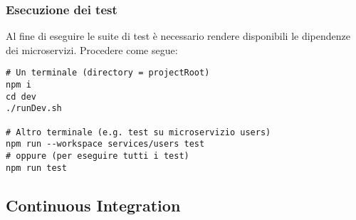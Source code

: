 


%
%
%
\subsubsection{Esecuzione dei test}

Al fine di eseguire le suite di test è necessario rendere disponibili le dipendenze dei microservizi.
%
Procedere come segue:

\begin{verbatim}
# Un terminale (directory = projectRoot)
npm i
cd dev
./runDev.sh

# Altro terminale (e.g. test su microservizio users)
npm run --workspace services/users test
# oppure (per eseguire tutti i test)
npm run test
\end{verbatim}

%
%
%
\subsection{Continuous Integration}

